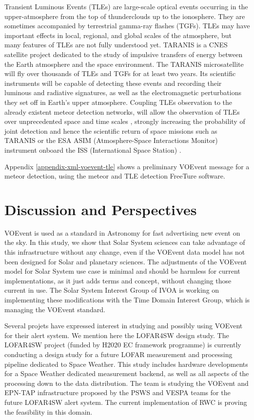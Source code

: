 \documentclass[referee,a4paper,12pt,traditabstract]{swsc}
\begin{document}
\begin{linenumbers}
Transient Luminous Events (TLEs) are large-scale optical events occurring in the upper-atmosphere from the top of thunderclouds up to the ionosphere. They are sometimes accompanied by terrestrial gamma-ray flashes (TGFs). TLEs may have important effects in local, regional, and global scales of the atmosphere, but many features of TLEs are not fully understood yet. TARANIS is a CNES satellite project dedicated to the study of impulsive transfers of energy between the Earth atmosphere and the space environment. The TARANIS microsatellite will fly over thousands of TLEs and TGFs for at least two years. Its scientific instruments will be capable of detecting these events and recording their luminous and radiative signatures, as well as the electromagnetic perturbations they set off in Earth's upper atmosphere. Coupling TLEs observation to the already existent meteor detection networks, will allow the observation of TLEs over unprecedented space and time scales \cite{2017AGUFMAE23A2469G}, strongly increasing the probability of joint detection and hence the scientific return of space missions such as TARANIS or the ESA ASIM (Atmosphere-Space Interactions Monitor) instrument onboard the ISS (International Space Station) \cite{2009AIPC.1118....8N}.

Appendix \ref{appendix-xml-voevent-tle} shows a preliminary VOEvent message for a meteor detection, using the meteor and TLE detection FreeTure \cite{2014pim4.conf...39A} software. 

\section{Discussion and Perspectives}

VOEvent is used as a standard in Astronomy for fast advertising new event on the sky. In this study, we show that Solar System sciences can take advantage of this infrastructure without any change, even if the VOEvent data model has not been designed for Solar and planetary sciences. The adjustments of the VOEvent model for Solar System use case is minimal and should be harmless for current implementations, as it just adds terms and concept, without changing those current in use. The Solar System Interest Group of IVOA is working on implementing these modifications with the Time Domain Interest Group, which is managing the VOEvent standard. 

Several projets have expressed interest in studying and possibly using VOEvent for their alert system. We mention here the LOFAR4SW design study.
The LOFAR4SW project (funded by H2020 EC framework programme) is currently conducting a design study for a future LOFAR measurement and processing pipeline dedicated to Space Weather. This study includes hardware developments for a Space Weather dedicated measurement backend, as well as all aspects of the processing down to the data distribution. The team is studying the VOEvent and EPN-TAP infrastructure proposed by the PSWS and VESPA teams for the future LOFAR4SW alert system. The current implementation of RWC is proving the feasibility in this domain. 


\end{linenumbers}
\end{document}
